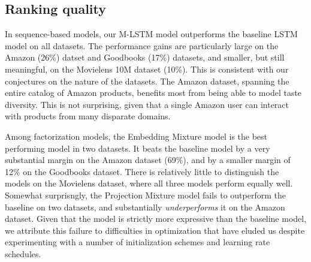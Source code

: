 \documentclass[sigchi]{acmart}
\begin{document}
\subsection{Ranking quality}
In sequence-based models, our M-LSTM model outperforms the baseline LSTM model on all datasets. The performance gains are particularly large on the Amazon (26\%) datset and Goodbooks (17\%) datasets, and smaller, but still meaningful, on the Movielens 10M dataset (10\%). This is consistent with our conjectures on the nature of the datasets. The Amazon dataset, spanning the entire catalog of Amazon products, benefits most from being able to model taste diversity. This is not surprising, given that a single Amazon user can interact with products from many disparate domains.

Among factorization models, the Embedding Mixture model is the best performing model in two datasets. It beats the baseline model by a very substantial margin on the Amazon dataset (69\%), and by a smaller margin of 12\% on the Goodbooks dataset. There is relatively little to distinguish the models on the Movielens dataset, where all three models perform equally well. Somewhat surprisngly, the Projection Mixture model fails to outperform the baseline on two datasets, and substantially \emph{underperforms} it on the Amazon dataset. Given that the model is strictly more expressive than the baseline model, we attribute this failure to difficulties in optimization that have eluded us despite experimenting with a number of initialization schemes and learning rate schedules.
\end{document}
